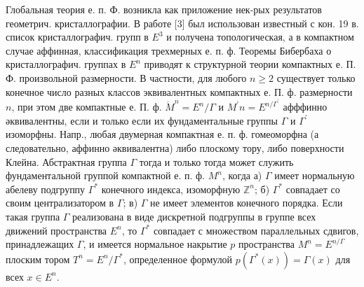 \documentclass[10pt]{article}
\begin{document}
Глобальная теория е. п. Ф. возникла как приложение нек-рых результатов геометрич. кристаллографии. В работе [3] был использован известный с кон. 19 в. список кристаллографич. групп в $E^{3}$ и получена топологическая, а в компактном случае аффинная, классификация трехмерных е. п. ф. Теоремы Бибербаха о кристаллографич. группах в $E^{n}$ приводят к структурной теории компактных е. П. Ф. произвольной размерности. В частности, для любого $n \geqslant 2$ существует только конечное число разных классов эквивалентных компактных е. П. ф. размерности $n$, при этом две компактные е. П. ф. $\dot{M}^{n}=E^{n} / \Gamma$ и $M^{\prime} n=E^{n / \Gamma^{\prime}}$ афффинно әквивалентны, если и только если их фундаментальные группы $\Gamma$ и $\Gamma^{\prime}$ изоморфны. Напр., любая двумерная компактная е. п. ф. гомеоморфна (а следовательно, аффинно әквивалентна) либо плоскому тору, либо поверхности Клейна. Абстрактная группа $\Gamma$ тогда и только тогда может служить фундаментальной группой компактной е. п. ф. $M^{n}$, когда а) $\Gamma$ имеет нормальную абелеву подгруппу $\Gamma^{*}$ конечного индекса, изоморфную $\mathbb{Z}^{n}$; б) $\Gamma^{*}$ совпадает со своим централизатором в $\Gamma$; в) $\Gamma$ не имеет элементов конечного порядка. Если такая группа $\Gamma$ реализована в виде дискретной подгруппы в группе всех движений пространства $E^{n}$, то $\Gamma^{*}$ совпадает с множеством параллельных сдвигов, принадлежащих $\Gamma$, и имеется нормальное накрытие $p$ пространства $M^{n}=E^{n / \Gamma}$ плоским тором $T^{n}=E^{n} / \Gamma^{*}$, определенное формулой $p\left(\Gamma^{*}(x)\right)=\Gamma(x)$ для всех $x \in E^{n}$.
\end{document}
